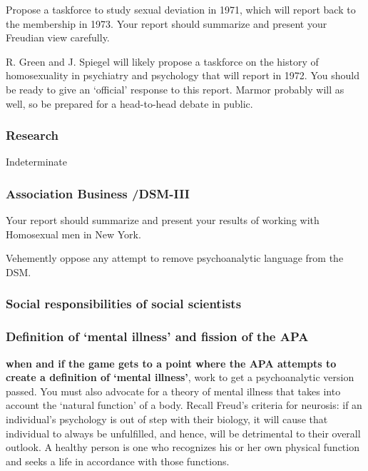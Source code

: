 \begin{refsection}
Propose a taskforce to study sexual deviation in 1971, which will report back to the membership in 1973. Your report should summarize and present your Freudian view carefully.

R. Green and J. Spiegel will likely propose a taskforce on the history of homosexuality in psychiatry and psychology that will report in 1972. You should be ready to give an `official' response to this report. Marmor probably will as well, so be prepared for a head-to-head debate in public.

\subsubsection{Research}
\label{research}

Indeterminate

\subsubsection{Association Business \slash  DSM-III}
\label{associationbusinessdsm-iii}

\begin{writingtask}[Bieber]\label{writingtask:bieber}
Your report should summarize and present your results of working with Homosexual men in New York.
\end{writingtask}

Vehemently oppose any attempt to remove psychoanalytic language from the DSM.

\subsubsection{Social responsibilities of social scientists}
\label{socialresponsibilitiesofsocialscientists}

\subsubsection{Definition of ‘mental illness’ and fission of the APA}
\label{definitionof‘mentalillness’andfissionoftheapa}

\textbf{when and if the game gets to a point where the APA attempts to create a definition of ‘mental illness’}, work to get a psychoanalytic version passed. You must also advocate for a theory of mental illness that takes into account the `natural function' of a body. Recall Freud's criteria for neurosis: if an individual's psychology is out of step with their biology, it will cause that individual to always be unfulfilled, and hence, will be detrimental to their overall outlook. A healthy person is one who recognizes his or her own physical function and seeks a life in accordance with those functions.


\end{refsection}
